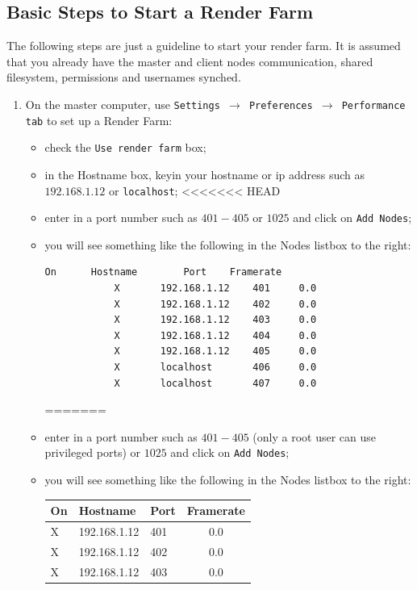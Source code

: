 \subsection{Basic Steps to Start a Render Farm}%
\label{sub:basic_steps_start_render_farm}

The following steps are just a guideline to start your render farm.  It is assumed that you already have the master and client nodes communication, shared filesystem, permissions and usernames synched.

\begin{enumerate}
    \item On the master computer, use \texttt{Settings $\rightarrow$ Preferences $\rightarrow$ Performance tab} to set up a Render Farm:
    \begin{itemize}
        \item check the \texttt{Use render farm} box;
        \item in the Hostname box, keyin your hostname or ip address such as $192.168.1.12$ or \texttt{localhost};
<<<<<<< HEAD
        \item enter in a port number such as $401-405$ or $1025$ and click on \texttt{Add Nodes};
        \item you will see something like the following in the Nodes listbox to the right:
        \begin{lstlisting}[language=bash]
            On		Hostname		Port	Framerate
            X		192.168.1.12	401	    0.0
            X		192.168.1.12	402	    0.0
            X		192.168.1.12	403	    0.0 
            X		192.168.1.12	404	    0.0
            X		192.168.1.12	405	    0.0
            X		localhost		406	    0.0
            X		localhost		407	    0.0
        \end{lstlisting}
=======
        \item enter in a port number such as $401-405$ (only a root user can use privileged ports) or $1025$  and click on \texttt{Add Nodes};
        \item you will see something like the following in the Nodes listbox to the right:
            \begin{tabular}{lllc}
                On & Hostname     & Port & Framerate \\\midrule
                X  & 192.168.1.12 & 401  & 0.0       \\
                X  & 192.168.1.12 & 402  & 0.0       \\
                X  & 192.168.1.12 & 403  & 0.0       \\

\end{tabular}
\end{itemize}
\end{enumerate}
